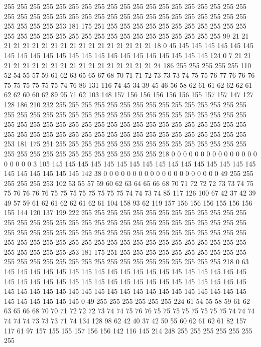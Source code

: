 255 255 255 255 255 255 255 255 255 255 255 255 255 255 255 255 255 255 255 255
255 255 255 255 255 255 255 255 255 255 255 255 255 255 255 255 255 255 255 255
255 255 253 181 175 251 255 255 255 255 255 255 255 255 255 255 255 255 255 255
255 255 255 255 255 255 255 255 255 255 255 255 255 255 99 21 21 21 21 21
21 21 21 21 21 21 21 21 21 21 21 21 21 18 0 45 145 145 145 145
145 145 145 145 145 145 145 145 145 145 145 145 145 145 145 145 145 145 124 0
7 21 21 21 21 21 21 21 21 21 21 21 21 21 21 21 21 21 21 24
186 255 255 255 255 255 110 52 54 55 57 59 61 62 63 65 65 67 68 70
71 71 72 73 73 73 74 75 75 76 77 76 76 76 75 75 75 75 75 75
74 76 86 131 116 74 45 34 39 45 46 56 58 62 61 61 62 62 62 61
62 62 60 60 62 89 95 71 62 103 148 157 156 156 156 156 156 155 157 157
147 127 128 186 210 232 255 255 255 255 255 255 255 255 255 255 255 255 255 255
255 255 255 255 255 255 255 255 255 255 255 255 255 255 255 255 255 255 255 255
255 255 255 255 255 255 255 255 255 255 255 255 255 255 255 255 255 255 255 255
255 255 255 255 255 255 255 255 255 255 255 255 255 255 255 255 255 255 253 181
175 251 255 255 255 255 255 255 255 255 255 255 255 255 255 255 255 255 255 255
255 255 255 255 255 255 255 255 255 218 0 0 0 0 0 0 0 0 0 0
0 0 0 0 0 0 0 0 0 0 3 105 145 145 145 145 145 145 145 145
145 145 145 145 145 145 145 145 145 145 145 145 145 145 142 38 0 0 0 0
0 0 0 0 0 0 0 0 0 0 0 0 0 0 0 0 49 255 255 255
255 255 253 102 53 55 57 59 60 62 63 64 65 66 68 70 71 72 72 72
73 73 74 75 75 76 76 76 76 75 75 75 75 75 75 75 75 74 74 73
74 85 117 126 100 67 42 37 42 39 49 57 59 61 62 61 62 62 61 62
61 104 158 93 62 119 157 156 156 156 155 156 156 155 144 120 137 199 222 255
255 255 255 255 255 255 255 255 255 255 255 255 255 255 255 255 255 255 255 255
255 255 255 255 255 255 255 255 255 255 255 255 255 255 255 255 255 255 255 255
255 255 255 255 255 255 255 255 255 255 255 255 255 255 255 255 255 255 255 255
255 255 255 255 255 255 255 255 255 255 255 255 255 255 253 181 175 251 255 255
255 255 255 255 255 255 255 255 255 255 255 255 255 255 255 255 255 255 255 255
255 255 255 255 255 218 0 63 145 145 145 145 145 145 145 145 145 145 145 145
145 145 145 145 145 145 145 145 145 145 145 145 145 145 145 145 145 145 145 145
145 145 145 145 145 145 145 145 145 145 145 145 145 145 145 145 145 145 145 145
145 145 145 145 145 145 145 145 145 145 145 0 49 255 255 255 255 255 255 224
61 54 55 58 59 61 62 63 65 66 68 70 70 71 72 72 72 73 74 74
75 76 76 75 75 75 75 75 75 75 75 74 74 74 74 74 74 73 73 73
71 74 134 128 98 62 42 40 37 42 50 55 60 62 61 62 61 82 157 117
61 97 157 155 155 157 156 156 142 116 145 214 248 255 255 255 255 255 255 255
